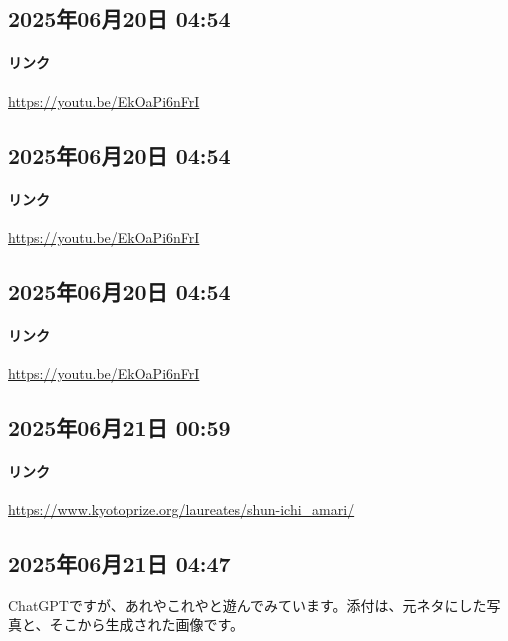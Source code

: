 \subsection*{2025年06月20日 04:54}

\paragraph{リンク}
\url{https://youtu.be/EkOaPi6nFrI}

\subsection*{2025年06月20日 04:54}

\paragraph{リンク}
\url{https://youtu.be/EkOaPi6nFrI}

\subsection*{2025年06月20日 04:54}

\paragraph{リンク}
\url{https://youtu.be/EkOaPi6nFrI}

\subsection*{2025年06月21日 00:59}

\paragraph{リンク}
\url{https://www.kyotoprize.org/laureates/shun-ichi_amari/}

\subsection*{2025年06月21日 04:47}

ChatGPTですが、あれやこれやと遊んでみています。添付は、元ネタにした写真と、そこから生成された画像です。


